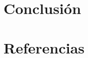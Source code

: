 \documentclass[a4paper,10pt]{article}
\begin{document}
	\section{Conclusión}
	
	\section{Referencias}
	\nocite{*}
	\printbibliography[heading=none]
\end{document}
